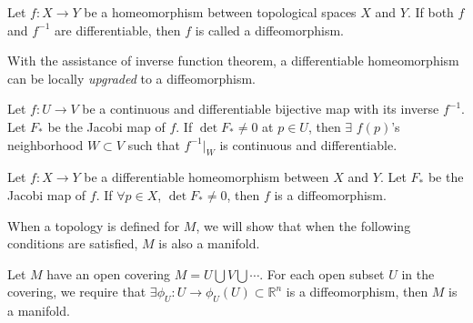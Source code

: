 \documentclass[11pt, a4paper]{book}
\begin{document}
\begin{Definition}[Diffeomorphism]
  Let $f: X \rightarrow Y$ be a homeomorphism between topological spaces $X$ and
  $Y$. If both $f$ and $f^{-1}$ are differentiable, then $f$ is called a
  diffeomorphism.
\end{Definition}

With the assistance of inverse function theorem, a differentiable homeomorphism can be
locally \textit{upgraded} to a diffeomorphism.

\begin{Theorem}
  \label{theo:inv-func}
  Let $f: U \rightarrow V$ be a continuous and differentiable bijective map with
  its inverse $f^{-1}$. Let $F_{*}$ be the Jacobi map of $f$. If $\det{F_{*}}
  \neq 0$ at $p \in U$, then $\exists$ $f(p)$'s neighborhood $W \subset V$
  such that $f^{-1}\big\vert_{W}$ is continuous and differentiable.
\end{Theorem}


\begin{Proposition}
  \label{prop:jacobi-and-diffeomorphism}
  Let $f: X \rightarrow Y$ be a differentiable homeomorphism between $X$ and
  $Y$. Let $F_{*}$ be the Jacobi map of $f$. If $\forall p \in X$, $\det{F_{*}}
  \neq 0$, then $f$ is a diffeomorphism.
\end{Proposition}

When a topology is defined for $M$, we will show that when the following
conditions are satisfied, $M$ is also a manifold.

\begin{Proposition}
  \label{prop:local-diffeomorphism-and-manifold}
  Let $M$ have an open covering $M=U \bigcup V \bigcup \cdots$. For each open
  subset $U$ in the covering, we require that $\exists \phi_U: U \rightarrow
  \phi_U(U) \subset \mathbb{R}^n$ is a diffeomorphism, then $M$ is a manifold.
\end{Proposition}
\end{document}
